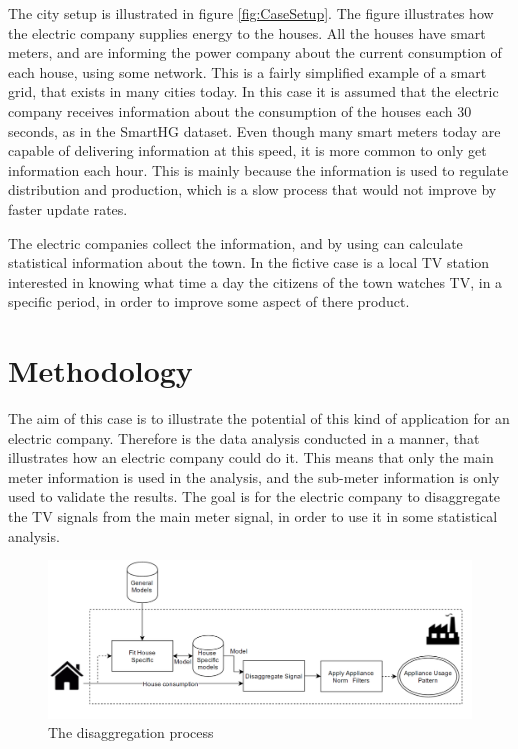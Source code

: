 The city setup is illustrated in figure \ref{fig:CaseSetup}. The figure illustrates how the electric company supplies energy to the houses. All the houses have smart meters, and are informing the power company about the current consumption of each house, using some network. This is a fairly simplified example of a smart grid, that exists in many cities today. In this case it is assumed that the electric company receives information about the consumption of the houses each 30 seconds, as in the SmartHG dataset. Even though many smart meters today are capable of delivering information at this speed, it is more common to only get information each hour. This is mainly because the information is used to regulate distribution and production, which is a slow process that would not improve by faster update rates.  

The electric companies collect the information, and by using  can calculate statistical information about the town. In the fictive case is a local TV station interested in knowing what time a day the citizens of the town watches TV, in a specific period, in order to improve some aspect of there product. 

\section{Methodology}
The aim of this case is to illustrate the potential of this kind of application for an electric company. Therefore is the data analysis conducted in a manner, that illustrates how an electric company could do it. This means that only the main meter information is used in the analysis, and the sub-meter information is only used to validate the results.  The goal is for the electric company to disaggregate the TV signals from the main meter signal, in order to use it in some statistical analysis. 

\begin{figure}[H]
\centering
\includegraphics[width=1\textwidth]{billeder/Electric company method.png}
\caption{The disaggregation process}
\label{fig:ECM}
\end{figure}


